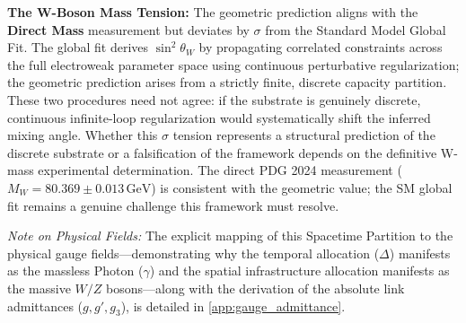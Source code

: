 \textbf{The W-Boson Mass Tension:} The geometric prediction aligns with the \textbf{Direct Mass} measurement but deviates by \WeakAngleGlobalSigma$\sigma$ from the Standard Model Global Fit. The global fit derives $\sin^2\theta_W$ by propagating correlated constraints across the full electroweak parameter space using continuous perturbative regularization; the geometric prediction arises from a strictly finite, discrete capacity partition. These two procedures need not agree: if the substrate is genuinely discrete, continuous infinite-loop regularization would systematically shift the inferred mixing angle. Whether this \WeakAngleGlobalSigma$\sigma$ tension represents a structural prediction of the discrete substrate or a falsification of the framework depends on the definitive W-mass experimental determination. The direct PDG 2024 measurement ($M_W = 80.369 \pm 0.013\,\mathrm{GeV}$) is consistent with the geometric value; the SM global fit remains a genuine challenge this framework must resolve.

\textit{Note on Physical Fields:} The explicit mapping of this Spacetime Partition to the physical gauge fields---demonstrating why the temporal allocation ($\Delta$) manifests as the massless Photon ($\gamma$) and the spatial infrastructure allocation manifests as the massive $W/Z$ bosons---along with the derivation of the absolute link admittances ($g, g', g_3$), is detailed in \cref{app:gauge_admittance}.